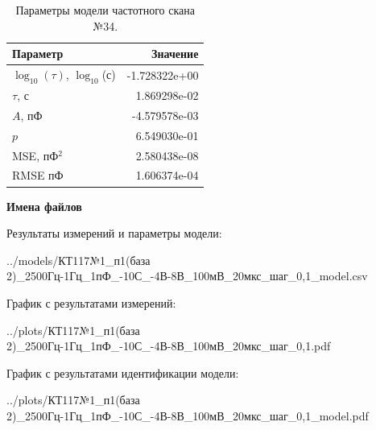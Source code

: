 \begin{table}[!ht]
    \centering
    \caption{Параметры модели частотного скана №34.}
    \begin{tabular}{|l|r|}
        \hline
        Параметр                                       & Значение                  \\ \hline
        $\log_{10}(\tau)$, $\log_{10}$(с)              & -1.728322e+00             \\ \hline
        $\tau$, с                                      & 1.869298e-02              \\ \hline
        $A$, пФ                                        & -4.579578e-03             \\ \hline
        $p$                                            & 6.549030e-01              \\ \hline
        MSE, пФ$^2$                                    & 2.580438e-08              \\ \hline
        RMSE пФ                                        & 1.606374e-04              \\ \hline
    \end{tabular}
    \label{table:frequency_scan_model_34}
\end{table}

\textbf{Имена файлов}

Результаты измерений и параметры модели:

\scriptsize../models/КТ117№1\_п1(база 2)\_2500Гц-1Гц\_1пФ\_-10С\_-4В-8В\_100мВ\_20мкс\_шаг\_0,1\_model.csv
\normalsize

График с результатами измерений:

\scriptsize../plots/КТ117№1\_п1(база 2)\_2500Гц-1Гц\_1пФ\_-10С\_-4В-8В\_100мВ\_20мкс\_шаг\_0,1.pdf
\normalsize

График с результатами идентификации модели:

\scriptsize../plots/КТ117№1\_п1(база 2)\_2500Гц-1Гц\_1пФ\_-10С\_-4В-8В\_100мВ\_20мкс\_шаг\_0,1\_model.pdf
\normalsize

